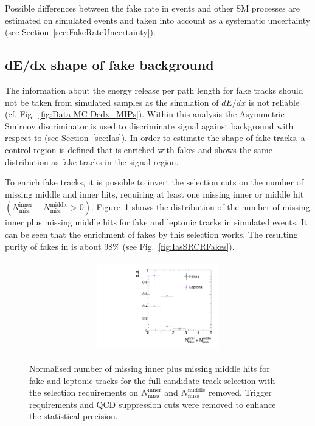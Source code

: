 Possible differences between the fake rate in \Zlep events and other SM processes are estimated on simulated events and taken into account as a systematic uncertainty (see Section~\ref{sec:FakeRateUncertainty}).

\subsection{dE/dx shape of fake background}
The information about the energy release per path length for fake tracks should not be taken from simulated samples as the simulation of $dE/dx$ is not reliable (cf. Fig.~\ref{fig:Data-MC-Dedx_MIPs}).
Within this analysis the Asymmetric Smirnov discriminator \ias is used to discriminate signal against background with respect to \dedx (see Section~\ref{sec:Ias}). 
In order to estimate the \ias shape of fake tracks, a control region \fakeCR is defined that is enriched with fakes and shows the same \ias distribution as fake tracks in the signal region.

To enrich fake tracks, it is possible to invert the selection cuts on the number of missing middle and inner hits, \ie requiring at least one missing inner or middle hit $\left( N_{\text{miss}}^{\text{inner}} +N_{\text{miss}}^{\text{middle}}>0\right)$.
Figure~\ref{fig:NMissInnerAndMiddle} shows the distribution of the number of missing inner plus missing middle hits for fake and leptonic tracks in simulated \WJets events.
It can be seen that the enrichment of fakes by this selection works.
The resulting purity of fakes in \fakeCR is about 98\% (see Fig.~\ref{fig:IasSRCRFakes}). 
\begin{figure}[!b]
  \centering 
  \begin{tabular}{c}
    \includegraphics[width=0.49\textwidth]{figures/analysis/Background/NLostInnerPlusMiddleForAllBkg_chiTracksQCDsupressionTrigger.pdf}
  \end{tabular}
  \caption{Normalised number of missing inner plus missing middle hits for fake and leptonic tracks for the full candidate track selection with the selection requirements on $N_{\text{miss}}^{\text{inner}}$ and $N_{\text{miss}}^{\text{middle}}$ removed. Trigger requirements and QCD suppression cuts were removed to enhance the statistical precision.}
  \label{fig:NMissInnerAndMiddle}
\end{figure}

